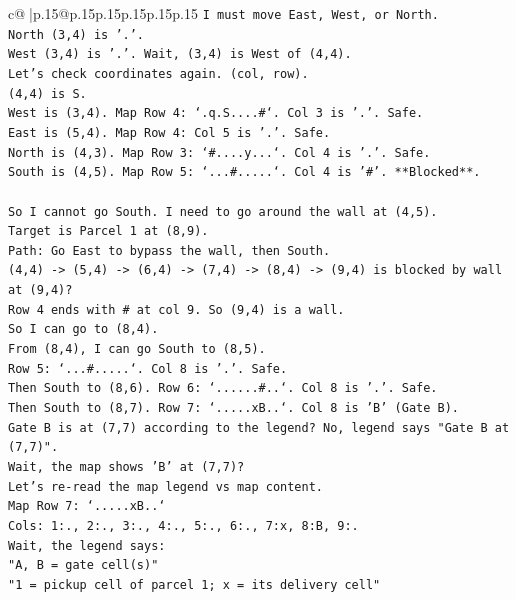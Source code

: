 \documentclass{article}
\begin{document}
{\begin{supertabular}{c@{$\;$}|p{.15\linewidth}@{}p{.15\linewidth}p{.15\linewidth}p{.15\linewidth}p{.15\linewidth}p{.15\linewidth}}
{{{\texttt{I must move East, West, or North.} \\
\texttt{North (3,4) is '.'.} \\
\texttt{West (3,4) is '.'. Wait, (3,4) is West of (4,4).} \\
\texttt{Let's check coordinates again. (col, row).} \\
\texttt{(4,4) is S.} \\
\texttt{West is (3,4). Map Row 4: `.q.S....\#`. Col 3 is '.'. Safe.} \\
\texttt{East is (5,4). Map Row 4: Col 5 is '.'. Safe.} \\
\texttt{North is (4,3). Map Row 3: `\#....y...`. Col 4 is '.'. Safe.} \\
\texttt{South is (4,5). Map Row 5: `...\#.....`. Col 4 is '\#'. **Blocked**.} \\
\\ 
\texttt{So I cannot go South. I need to go around the wall at (4,5).} \\
\texttt{Target is Parcel 1 at (8,9).} \\
\texttt{Path: Go East to bypass the wall, then South.} \\
\texttt{(4,4) {-}> (5,4) {-}> (6,4) {-}> (7,4) {-}> (8,4) {-}> (9,4) is blocked by wall at (9,4)?} \\
\texttt{Row 4 ends with \# at col 9. So (9,4) is a wall.} \\
\texttt{So I can go to (8,4).} \\
\texttt{From (8,4), I can go South to (8,5).} \\
\texttt{Row 5: `...\#.....`. Col 8 is '.'. Safe.} \\
\texttt{Then South to (8,6). Row 6: `......\#..`. Col 8 is '.'. Safe.} \\
\texttt{Then South to (8,7). Row 7: `.....xB..`. Col 8 is 'B' (Gate B).} \\
\texttt{Gate B is at (7,7) according to the legend? No, legend says "Gate B at (7,7)".} \\
\texttt{Wait, the map shows 'B' at (7,7)?} \\
\texttt{Let's re{-}read the map legend vs map content.} \\
\texttt{Map Row 7: `.....xB..`} \\
\texttt{Cols: 1:., 2:., 3:., 4:., 5:., 6:., 7:x, 8:B, 9:.} \\
\texttt{Wait, the legend says:} \\
\texttt{"A, B = gate cell(s)"} \\
\texttt{"1 = pickup cell of parcel 1; x = its delivery cell"} \\
}}}
\end{supertabular}}
\end{document}
